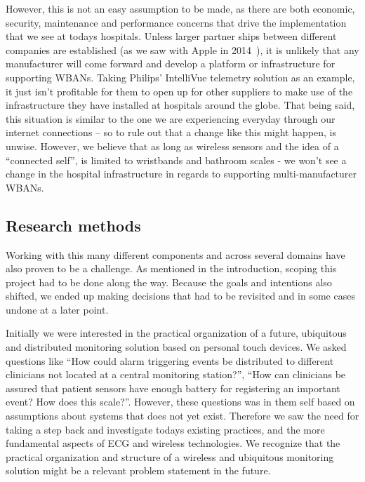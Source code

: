 However, this is not an easy assumption to be made, as there are both economic, security, maintenance and performance concerns that drive the implementation that we see at todays hospitals. Unless larger partner ships between different companies are established (as we saw with Apple in 2014~\cite{WhyAp90:online}), it is unlikely that any manufacturer will come forward and develop a platform or infrastructure for supporting WBANs. Taking Philips' IntelliVue telemetry solution as an example, it just isn't profitable for them to open up for other suppliers to make use of the infrastructure they have installed at hospitals around the globe. That being said, this situation is similar to the one we are experiencing everyday through our internet connections -- so to rule out that a change like this might happen, is unwise. However, we believe that as long as wireless sensors and the idea of a ``connected self'', is limited to wristbands and bathroom scales - we won't see a change in the hospital infrastructure in regards to supporting multi-manufacturer WBANs. 


\subsection{Research methods} %
\label{ssub:research_methods}

Working with this many different components and across several domains have also proven to be a challenge. As mentioned in the introduction, scoping this project had to be done along the way. Because the goals and intentions also shifted, we ended up making decisions that had to be revisited and in some cases undone at a later point.

Initially we were interested in the practical organization of a future, ubiquitous and distributed monitoring solution based on personal touch devices. We asked questions like ``How could alarm triggering events be distributed to different clinicians not located at a central monitoring station?'', ``How can clinicians be assured that patient sensors have enough battery for registering an important event? How does this scale?''. However, these questions was in them self based on assumptions about systems that does not yet exist. Therefore we saw the need for taking a step back and investigate todays existing practices, and the more fundamental aspects of ECG and wireless technologies. We recognize that the practical organization and structure of a wireless and ubiquitous monitoring solution might be a relevant problem statement in the future.

